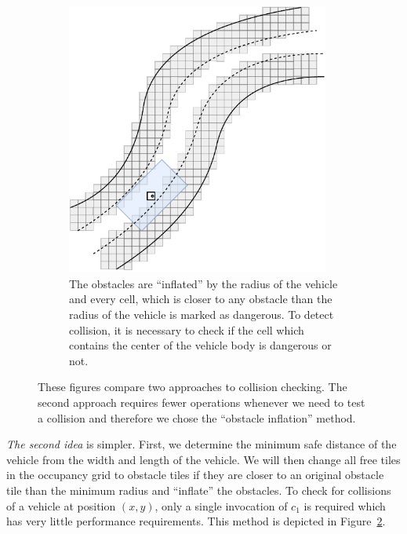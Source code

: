\begin{figure}[!tbp]
\begin{subfigure}[t]{0.45\textwidth}
		\includegraphics[width=0.95\textwidth]{../img/obstacle_inflation}
		\caption{The obstacles are ``inflated'' by the radius of the vehicle and every cell, which is closer to any obstacle than the radius of the vehicle is marked as dangerous. To detect collision, it is necessary to check if the cell which contains the center of the vehicle body is dangerous or not.}
		\label{fig:collision_detection_inflation}
	\end{subfigure}
	
	\caption{These figures compare two approaches to collision checking. The second approach requires fewer operations whenever we need to test a collision and therefore we chose the ``obstacle inflation'' method.}
\end{figure}

\textit{The second idea} is simpler. First, we determine the minimum safe distance of the vehicle from the width and length of the vehicle. We will then change all free tiles in the occupancy grid to obstacle tiles if they are closer to an original obstacle tile than the minimum radius and ``inflate'' the obstacles. To check for collisions of a vehicle at position $(x, y)$, only a single invocation of $c_1$ is required which has very little performance requirements. This method is depicted in Figure~\ref{fig:collision_detection_inflation}.

